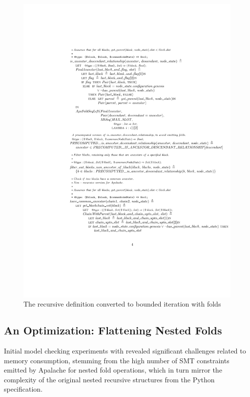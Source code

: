 \begin{figure}
  \includegraphics[width=\textwidth]{images/is_ancestor_descendant_relationship_folds.pdf}
  \caption{The recursive definition converted to bounded iteration with folds}%
  \label{fig:relationship-folds}
\end{figure}

\subsection{An Optimization: Flattening Nested Folds}

Initial model checking experiments with \SpecTwo{} revealed significant
challenges related to memory consumption, stemming from the high number of SMT
constraints emitted by Apalache for nested fold operations, which in turn mirror
the complexity of the original nested recursive structures from the Python
specification.

